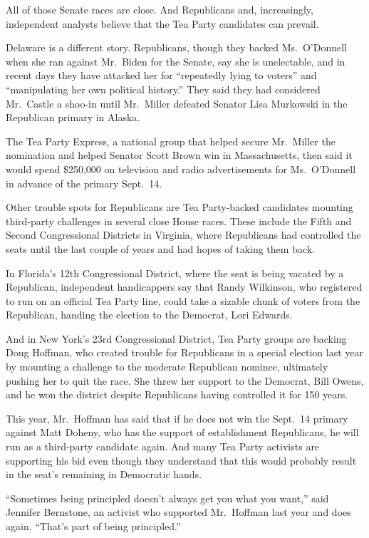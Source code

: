 ﻿\documentclass[12pt]{article}
\begin{document}
All of those Senate races are close. And Republicans and, increasingly, independent analysts believe
that the Tea Party candidates can prevail.

Delaware is a different story. Republicans, though they backed Ms.~O'Donnell when she ran against
Mr.~Biden for the Senate, say she is unelectable, and in recent days they have attacked her for
``repeatedly lying to voters'' and ``manipulating her own political history.'' They said they had
considered Mr.~Castle a shoo-in until Mr.~Miller defeated Senator Lisa Murkowski in the Republican
primary in Alaska.

The Tea Party Express, a national group that helped secure Mr.~Miller the nomination and helped
Senator Scott Brown win in Massachusetts, then said it would spend \$250,000 on television and radio
advertisements for Ms.~O'Donnell in advance of the primary Sept.~14.

Other trouble spots for Republicans are Tea Party-backed candidates mounting third-party challenges
in several close House races. These include the Fifth and Second Congressional Districts in
Virginia, where Republicans had controlled the seats until the last couple of years and had hopes of
taking them back.

In Florida's 12th Congressional District, where the seat is being vacated by a Republican,
independent handicappers say that Randy Wilkinson, who registered to run on an official Tea Party
line, could take a sizable chunk of voters from the Republican, handing the election to the
Democrat, Lori Edwards.

And in New York's 23rd Congressional District, Tea Party groups are backing Doug Hoffman, who
created trouble for Republicans in a special election last year by mounting a challenge to the
moderate Republican nominee, ultimately pushing her to quit the race. She threw her support to the
Democrat, Bill Owens, and he won the district despite Republicans having controlled it for 150
years.

This year, Mr.~Hoffman has said that if he does not win the Sept.~14 primary against Matt Doheny,
who has the support of establishment Republicans, he will run as a third-party candidate again. And
many Tea Party activists are supporting his bid even though they understand that this would probably
result in the seat's remaining in Democratic hands.

``Sometimes being principled doesn't always get you what you want,'' said Jennifer Bernstone, an
activist who supported Mr.~Hoffman last year and does again. ``That's part of being principled.''
\end{document}
